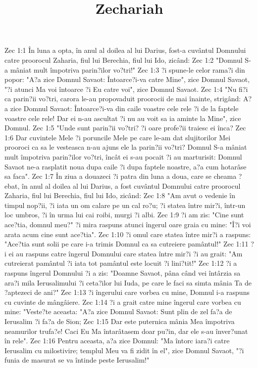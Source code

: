 

\title{Zechariah}

Zec 1:1  În luna a opta, în anul al doilea al lui Darius, fost-a cuvântul Domnului catre proorocul Zaharia, fiul lui Berechia, fiul lui Ido, zicând:
Zec 1:2  "Domnul S-a mâniat mult împotriva parin?ilor vo?tri!"
Zec 1:3  ?i spune-le celor rama?i din popor: "A?a zice Domnul Savaot: Întoarce?i-va catre Mine", zice Domnul Savaot, "?i atunci Ma voi întoarce ?i Eu catre voi", zice Domnul Savaot.
Zec 1:4  "Nu fi?i ca parin?ii vo?tri, carora le-au propovaduit proorocii de mai înainte, strigând: A?a zice Domnul Savaot: Întoarce?i-va din caile voastre cele rele ?i de la faptele voastre cele rele! Dar ei n-au ascultat ?i nu au voit sa ia aminte la Mine", zice Domnul.
Zec 1:5  "Unde sunt parin?ii vo?tri? ?i oare profe?ii traiesc ei înca?
Zec 1:6  Dar cuvintele Mele ?i poruncile Mele pe care le-am dat slujitorilor Mei prooroci ca sa le vesteasca n-au ajuns ele la parin?ii vo?tri? Domnul S-a mâniat mult împotriva parin?ilor vo?tri, încât ei s-au pocait ?i au marturisit: Domnul Savaot ne-a rasplatit noua dupa caile ?i dupa faptele noastre, a?a cum hotarâse sa faca".
Zec 1:7  În ziua a douazeci ?i patra din luna a doua, care se cheama ?ebat, în anul al doilea al lui Darius, a fost cuvântul Domnului catre proorocul Zaharia, fiul lui Berechia, fiul lui Ido, zicând:
Zec 1:8  "Am avut o vedenie în timpul nop?ii, ?i iata un om calare pe un cal ro?u; ?i statea între mir?i, într-un loc umbros, ?i în urma lui cai roibi, murgi ?i albi.
Zec 1:9  ?i am zis: "Cine sunt ace?tia, domnul meu?" ?i mira raspuns atunci îngerul oare graia cu mine: "Î?i voi arata acum cine sunt ace?tia".
Zec 1:10  ?i omul care statea între mir?i a raspuns: "Ace?tia sunt solii pe care i-a trimis Domnul ca sa cutreiere pamântul!"
Zec 1:11  ?i ei au raspuns catre îngerul Domnului care statea între mir?i ?i au grait: "Am cutreierat pamântul ?i iata tot pamântul este locuit ?i lini?tit!"
Zec 1:12  ?i a raspuns îngerul Domnului ?i a zis: "Doamne Savaot, pâna când vei întârzia sa ara?i mila Ierusalimului ?i ceta?ilor lui Iuda, pe care le faci sa simta mânia Ta de ?aptezeci de ani?"
Zec 1:13  ?i îngerului care vorbea cu mine, Domnul i-a raspuns cu cuvinte de mângâiere.
Zec 1:14  ?i a grait catre mine îngerul care vorbea cu mine: "Veste?te aceasta: "A?a zice Domnul Savaot: Sunt plin de zel fa?a de Ierusalim ?i fa?a de Sion;
Zec 1:15  Dar este puternica mânia Mea împotriva neamurilor trufa?e! Caci Eu Ma întarâtasem doar pu?in, dar ele s-au înver?unat în rele".
Zec 1:16  Pentru aceasta, a?a zice Domnul: "Ma întorc iara?i catre Ierusalim cu milostivire; templul Meu va fi zidit în el", zice Domnul Savaot, "?i funia de masurat se va întinde peste Ierusalim!"
